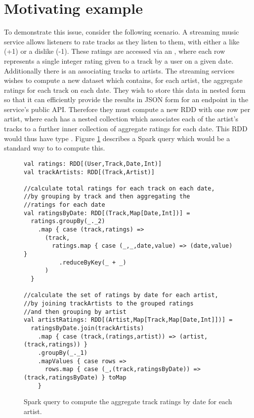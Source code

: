 \section{Motivating example} {

To demonstrate this issue, consider the following scenario. A streaming music service allows listeners to rate tracks as they listen to them, with either a like (+1) or a dislike (-1). These ratings are accessed via an , where each row represents a single integer rating given to a track by a user on a given date. Additionally there is an  associating tracks to artists. The streaming services wishes to compute a new dataset which contains, for each artist, the aggregate ratings for each track on each date. They wish to store this data in nested form so that it can efficiently provide the results in JSON form for an endpoint in the service's public API. Therefore they must compute a new RDD with one row per artist, where each has a nested collection which associates each of the artist's tracks to a further inner collection of aggregate ratings for each date. This RDD would thus have type . Figure \ref{exsparkquery} describes a Spark query which would be a standard way to to compute this.

\begin{figure}
\begin{lstlisting}
val ratings: RDD[(User,Track,Date,Int)]
val trackArtists: RDD[(Track,Artist)]

//calculate total ratings for each track on each date,
//by grouping by track and then aggregating the
//ratings for each date
val ratingsByDate: RDD[(Track,Map[Date,Int])] =
  ratings.groupBy(_._2)
    .map { case (track,ratings) =>
      (track,
        ratings.map { case (_,_,date,value) => (date,value) }
          .reduceByKey(_ + _)
      )
  }

//calculate the set of ratings by date for each artist,
//by joining trackArtists to the grouped ratings
//and then grouping by artist
val artistRatings: RDD[(Artist,Map[Track,Map[Date,Int]])] =
  ratingsByDate.join(trackArtists)
    .map { case (track,(ratings,artist)) => (artist,(track,ratings)) }
    .groupBy(_._1)
    .mapValues { case rows =>
      rows.map { case (_,(track,ratingsByDate)) => (track,ratingsByDate) } toMap
    }
\end{lstlisting}
\caption{Spark query to compute the aggregate track ratings by date for each artist.}
\label{exsparkquery}
\end{figure}

}
